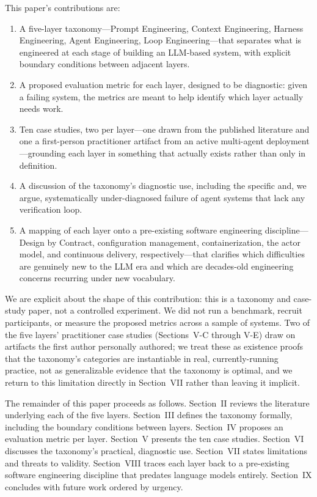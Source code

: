 \documentclass[journal]{IEEEtran}
\begin{document}
This paper's contributions are:

\begin{enumerate}
\item A five-layer taxonomy---Prompt Engineering, Context Engineering, Harness Engineering, Agent Engineering, Loop Engineering---that separates what is engineered at each stage of building an LLM-based system, with explicit boundary conditions between adjacent layers.
\item A proposed evaluation metric for each layer, designed to be diagnostic: given a failing system, the metrics are meant to help identify which layer actually needs work.
\item Ten case studies, two per layer---one drawn from the published literature and one a first-person practitioner artifact from an active multi-agent deployment---grounding each layer in something that actually exists rather than only in definition.
\item A discussion of the taxonomy's diagnostic use, including the specific and, we argue, systematically under-diagnosed failure of agent systems that lack any verification loop.
\item A mapping of each layer onto a pre-existing software engineering discipline---Design by Contract, configuration management, containerization, the actor model, and continuous delivery, respectively---that clarifies which difficulties are genuinely new to the LLM era and which are decades-old engineering concerns recurring under new vocabulary.
\end{enumerate}

We are explicit about the shape of this contribution: this is a taxonomy and case-study paper, not a controlled experiment. We did not run a benchmark, recruit participants, or measure the proposed metrics across a sample of systems. Two of the five layers' practitioner case studies (Sections~V-C through V-E) draw on artifacts the first author personally authored; we treat these as existence proofs that the taxonomy's categories are instantiable in real, currently-running practice, not as generalizable evidence that the taxonomy is optimal, and we return to this limitation directly in Section~VII rather than leaving it implicit.

The remainder of this paper proceeds as follows. Section~II reviews the literature underlying each of the five layers. Section~III defines the taxonomy formally, including the boundary conditions between layers. Section~IV proposes an evaluation metric per layer. Section~V presents the ten case studies. Section~VI discusses the taxonomy's practical, diagnostic use. Section~VII states limitations and threats to validity. Section~VIII traces each layer back to a pre-existing software engineering discipline that predates language models entirely. Section~IX concludes with future work ordered by urgency.
\end{document}
